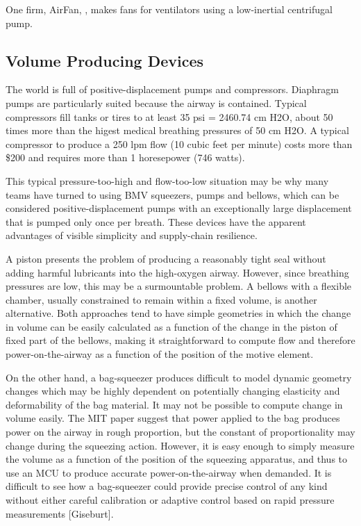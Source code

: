 \documentclass[conference]{article}
\begin{document}
One firm, AirFan, \cite{AirFan}, makes fans for ventilators using a low-inertial centrifugal pump.

\subsection{Volume Producing Devices}

The world is full of positive-displacement pumps and compressors. Diaphragm pumps are particularly suited because
the airway is contained. Typical compressors fill tanks or tires to at least 35 psi = 2460.74 cm H2O,
about 50 times more than the higest medical breathing pressures of 50 cm H2O. A typical compressor to produce a 250 lpm
flow (10 cubic feet per minute) costs more than \$200 and requires more than 1 horesepower (746 watts).

This typical pressure-too-high and flow-too-low situation may be why
many teams have turned to using BMV squeezers, pumps and bellows,
which can be considered positive-displacement pumps with an exceptionally
large displacement that is pumped only once per breath.
These devices have the apparent advantages of visible simplicity and
supply-chain resilience.

A piston presents the problem of producing a reasonably tight seal
without adding harmful lubricants into the high-oxygen airway.
However, since breathing pressures are low, this may be a surmountable problem.
A bellows with a flexible chamber, usually constrained
to remain within a fixed volume, is another alternative.  Both approaches tend to have simple geometries in which the
change in volume can be easily calculated as a function of the change in the piston of fixed part of the bellows, making
it straightforward to compute flow and therefore power-on-the-airway as a function of the position of the motive element.

On the other hand, a bag-squeezer produces difficult to model dynamic
geometry changes which may be highly dependent on potentially
changing elasticity and deformability of the bag material.
It may not be possible to compute change in volume easily.
The MIT paper suggest that power applied to the bag produces
power on the airway in rough proportion, but the constant of proportionality
may change during the squeezing action.
However, it is easy enough to simply measure the volume as a function of
the position of the squeezing apparatus, and thus to use
an MCU to produce accurate power-on-the-airway when demanded.
It is difficult to see how a bag-squeezer could provide precise control
of any kind without either careful calibration
or adaptive control based on rapid pressure measurements [Giseburt].
\end{document}
